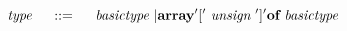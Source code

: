 \[
	~\emph{type}~ \quad ::= \quad
		~\emph{basictype}~ | \textbf{array} '['~\emph{unsign}~']' \textbf{of} ~\emph{basictype}~
\]